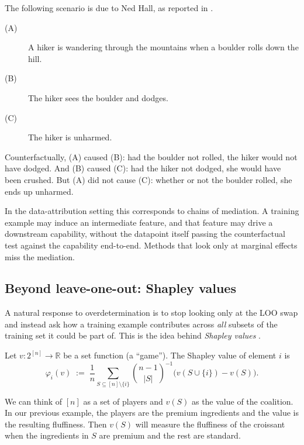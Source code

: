 \documentclass[11pt]{article}
\begin{document}
\begin{example}\label{ex:nontransitive}
  The following scenario is due to Ned Hall, as reported in \citet{hitchcock2001intransitivity}.
  \begin{description}
    \item[(A)] A hiker is wandering through the mountains when a boulder rolls down the hill.
    \item[(B)] The hiker sees the boulder and dodges.
    \item[(C)] The hiker is unharmed.
  \end{description}
  Counterfactually, (A) caused (B): had the boulder not rolled, the hiker would not have dodged. And (B) caused (C): had the hiker not dodged, she would have been crushed. But (A) did not cause (C): whether or not the boulder rolled, she ends up unharmed.
\end{example}

In the data-attribution setting this corresponds to chains of mediation. A training example may induce an intermediate feature, and that feature may drive a downstream capability, without the datapoint itself passing the counterfactual test against the capability end-to-end. Methods that look only at marginal effects miss the mediation.

\subsection{Beyond leave-one-out: Shapley values}\label{subsec:shapley}

A natural response to overdetermination is to stop looking only at the LOO swap and instead ask how a training example contributes across \emph{all} subsets of the training set it could be part of. This is the idea behind \emph{Shapley values} \citep{shapley1953value}.

\begin{definition}\label{def:shapley}
  Let $v: 2^{[n]} \to \mathbb{R}$ be a set function (a ``game''). The Shapley value of element $i$ is
  \[
    \varphi_i(v) \;:=\; \frac{1}{n}\sum_{S \subseteq [n] \setminus \{i\}} \binom{n-1}{|S|}^{-1} \bigl(v(S \cup \{i\}) - v(S)\bigr).
  \]
\end{definition}
We can think of $[n]$ as a set of players and $v(S)$ as the value of the coalition. In our previous example, the players are the premium ingredients and the value is the resulting fluffiness. Then $v(S)$ will measure the fluffiness of the croissant when the ingredients in $S$ are premium and the rest are standard.
\end{document}
